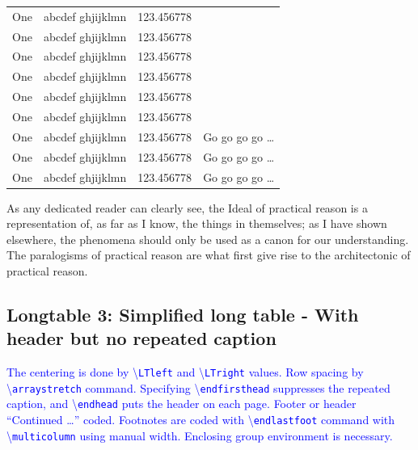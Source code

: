 \documentclass[phd,showgrids]{ndsu-thesis-2022}
\newcommand\italk[1]{\textcolor{blue}{#1}}  %
\newcommand\cmd[1]{\textbackslash\texttt{#1}}  %
\begin{document}
\begin{longtable}{l l l l}
One & abcdef ghjijklmn & 123.456778 \\
One & abcdef ghjijklmn & 123.456778 \\
One & abcdef ghjijklmn & 123.456778 \\
One & abcdef ghjijklmn & 123.456778 \\
One & abcdef ghjijklmn & 123.456778 \\
One & abcdef ghjijklmn & 123.456778 \\
One & abcdef ghjijklmn & 123.456778  & Go go go go \ldots \\
One & abcdef ghjijklmn & 123.456778  & Go go go go \ldots \\
One & abcdef ghjijklmn & 123.456778  & Go go go go \ldots \\
\bottomrule
\end{longtable}
\endgroup

As any dedicated reader can clearly see, the Ideal of practical reason is a representation
of, as far as I know, the things in themselves; as I have shown elsewhere, the phenomena
should only be used as a canon for our understanding. The paralogisms of practical reason
are what first give rise to the architectonic of practical reason.


\subsection{Longtable 3: Simplified long table - With header but no repeated caption }

\italk{The centering is done by \cmd{LTleft} and \cmd{LTright} values. Row spacing by \cmd{arraystretch} command. Specifying \cmd{endfirsthead} suppresses the repeated caption, and \cmd{endhead} puts the header on each page. Footer or header ``Continued \ldots'' coded. Footnotes are coded with \cmd{endlastfoot} command with \cmd{multicolumn} using manual width. Enclosing group environment is necessary.}
\end{document}
